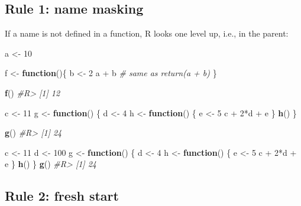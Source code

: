 \documentclass[]{book}
\newenvironment{Shaded}{}{}
\newcommand{\CommentTok}[1]{\textcolor[rgb]{0.38,0.63,0.69}{\textit{#1}}}
\newcommand{\ControlFlowTok}[1]{\textcolor[rgb]{0.00,0.44,0.13}{\textbf{#1}}}
\newcommand{\DecValTok}[1]{\textcolor[rgb]{0.25,0.63,0.44}{#1}}
\newcommand{\KeywordTok}[1]{\textcolor[rgb]{0.00,0.44,0.13}{\textbf{#1}}}
\newcommand{\NormalTok}[1]{#1}
\newcommand{\OperatorTok}[1]{\textcolor[rgb]{0.40,0.40,0.40}{#1}}
\newcommand{\StringTok}[1]{\textcolor[rgb]{0.25,0.44,0.63}{#1}}
\theoremstyle{definition}
\theoremstyle{definition}
\theoremstyle{definition}
\theoremstyle{remark}
\begin{document}
\hypertarget{rule-1-name-masking}{%
\subsection{Rule 1: name masking}\label{rule-1-name-masking}}

If a name is not defined in a function, R looks one level up, i.e., in
the parent:

\begin{Shaded}
\begin{Highlighting}[]
\NormalTok{a <-}\StringTok{ }\DecValTok{10}

\NormalTok{f <-}\StringTok{ }\ControlFlowTok{function}\NormalTok{()\{}
\NormalTok{  b <-}\StringTok{ }\DecValTok{2}
\NormalTok{  a }\OperatorTok{+}\StringTok{ }\NormalTok{b }\CommentTok{# same as return(a + b)}
\NormalTok{\}}

\KeywordTok{f}\NormalTok{()}
\CommentTok{#R> [1] 12}

\NormalTok{c <-}\StringTok{ }\DecValTok{11}
\NormalTok{g <-}\StringTok{ }\ControlFlowTok{function}\NormalTok{() \{}
\NormalTok{  d <-}\StringTok{ }\DecValTok{4}
\NormalTok{  h <-}\StringTok{ }\ControlFlowTok{function}\NormalTok{() \{}
\NormalTok{    e <-}\StringTok{ }\DecValTok{5}
\NormalTok{    c }\OperatorTok{+}\StringTok{ }\DecValTok{2}\OperatorTok{*}\NormalTok{d }\OperatorTok{+}\StringTok{ }\NormalTok{e}
\NormalTok{  \}}
  \KeywordTok{h}\NormalTok{()}
\NormalTok{\}}

\KeywordTok{g}\NormalTok{()}
\CommentTok{#R> [1] 24}



\NormalTok{c <-}\StringTok{ }\DecValTok{11}
\NormalTok{d <-}\StringTok{ }\DecValTok{100}
\NormalTok{g <-}\StringTok{ }\ControlFlowTok{function}\NormalTok{() \{}
\NormalTok{  d <-}\StringTok{ }\DecValTok{4}
\NormalTok{  h <-}\StringTok{ }\ControlFlowTok{function}\NormalTok{() \{}
\NormalTok{    e <-}\StringTok{ }\DecValTok{5}
\NormalTok{    c }\OperatorTok{+}\StringTok{ }\DecValTok{2}\OperatorTok{*}\NormalTok{d }\OperatorTok{+}\StringTok{ }\NormalTok{e}
\NormalTok{  \}}
  \KeywordTok{h}\NormalTok{()}
\NormalTok{\}}
 \KeywordTok{g}\NormalTok{()}
\CommentTok{#R> [1] 24}
\end{Highlighting}
\end{Shaded}

\hypertarget{rule-2-fresh-start}{%
\subsection{Rule 2: fresh start}\label{rule-2-fresh-start}}
\end{document}
